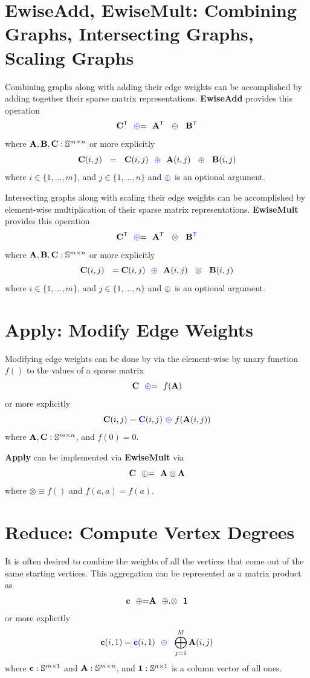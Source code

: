 \section{EwiseAdd, EwiseMult: Combining Graphs, Intersecting Graphs, Scaling Graphs}
  Combining graphs along with adding their edge weights can be accomplished by adding together their sparse matrix representations. {\bf EwiseAdd} provides this operation
$$
   {\bf C}^{\textcolor{blue}{\sf T}} ~~ {\textcolor{blue}{\oplus}}{=} ~~ {\bf A}^{\textcolor{blue}{\sf T}} ~~ \oplus ~~ {\bf B}^{\textcolor{blue}{\sf T}}
$$
where ${\bf A},{\bf B},{\bf C}: \mathbb{S}^{m \times n}$ or more explicitly 
$$
   {\bf C}(i,j) ~~ = ~~ {\bf C}(i,j) ~~ {\textcolor{blue}{\oplus}} ~~ {\bf A}(i,j) ~~ \oplus ~~{\bf B}(i,j)
$$
where $i \in \{1,...,m\}$, and $j \in \{1,...,n\}$ and ${\textcolor{blue}{\oplus}}$ is an optional argument. 

  Intersecting graphs along with scaling their edge weights can be accomplished by element-wise multiplication of their sparse matrix representations. {\bf EwiseMult} provides this operation
$$
   {\bf C}^{\textcolor{blue}{\sf T}} ~~ {\textcolor{blue}{\oplus}}{=} ~~ {\bf A}^{\textcolor{blue}{\sf T}} ~~ \otimes ~~ {\bf B}^{\textcolor{blue}{\sf T}}
$$
where ${\bf A},{\bf B},{\bf C}: \mathbb{S}^{m \times n}$ or more explicitly 
$$
   {\bf C}(i,j) ~~ = {\bf C}(i,j) ~~ {\textcolor{blue}{\oplus}} ~~ {\bf A}(i,j) ~~ \otimes ~~{\bf B}(i,j)
$$
where $i \in \{1,...,m\}$, and $j \in \{1,...,n\}$ and ${\textcolor{blue}{\oplus}}$ is an optional argument. 

\section{Apply: Modify Edge Weights}
  Modifying edge weights can be done by via the element-wise by unary function $f()$ to the values of a sparse matrix
$$
   {\bf C} ~~ {\textcolor{blue}{\oplus}}{=} ~~ f({\bf A})
$$
or more explicitly
$$
   {\bf C}(i,j) = {\textcolor{blue}{\bf C}}(i,j) ~ {\textcolor{blue}{\oplus}} ~f({\bf A}(i,j))
$$
where ${\bf A},{\bf C}: \mathbb{S}^{m \times n}$, and $f(0) = 0$.

  {\bf Apply} can be implemented via {\bf EwiseMult} via
$$
   {\bf C} ~~ {\textcolor{blue}{\oplus}}{=} ~~ {\bf A} \otimes {\bf A}
$$
where $\otimes \equiv f()$ and $f(a,a) = f(a)$.

\section{Reduce: Compute Vertex Degrees}
  It is often desired to combine the weights of all the vertices that come out of the same starting vertices.  This aggregation can be represented as a matrix product as
$$
   {\bf c} ~~ {\textcolor{blue}{\oplus}}{=} {\bf A} ~~ {\oplus}.{\otimes} ~~{\bf 1}
$$
or more explicitly
$$
   {\bf c}(i,1) = {\textcolor{blue}{\bf c}}(i,1) ~~ {\textcolor{blue}{\oplus}} ~~ \bigoplus_{j=1}^M {\bf A}(i,j)
$$
where ${\bf c}: \mathbb{S}^{m \times 1}$ and ${\bf A}: \mathbb{S}^{m \times n}$, and ${\bf 1}: \mathbb{S}^{n \times 1}$ is a column vector of all ones.

